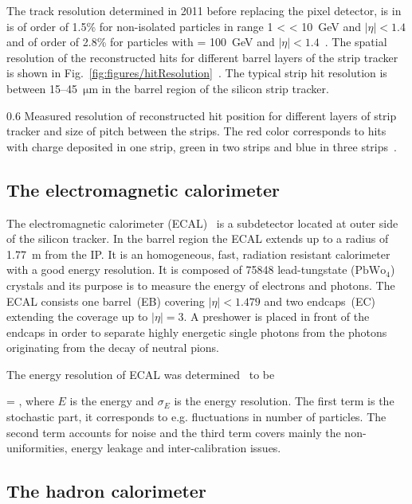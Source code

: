 The track resolution determined in 2011 before replacing the pixel detector, is in \pt is of order of 1.5\% for non-isolated particles in range 1 < \pt < 10~GeV and $|\eta| < 1.4$ and of order of 2.8\% for particles with \pt = 100~GeV and $|\eta| < 1.4$~\cite{TRK-11-001}. The spatial resolution of the reconstructed hits for different barrel layers of the strip tracker is shown in Fig.~\ref{fig:figures/hitResolution}~\cite{website:hitEff}. The typical strip hit resolution is between 15--45~$\mathrm{\mu m}$ in the barrel region of the silicon strip tracker.


                 {0.6}       
                 {Measured resolution of reconstructed hit position for different layers of strip tracker and size of pitch between the strips. The red color corresponds to hits with charge deposited in one strip, green in two strips and blue in three strips~\cite{website:hitEff}. }

\subsection{The electromagnetic calorimeter}

The electromagnetic calorimeter (ECAL)~\cite{tdrECAL} is a subdetector located at outer side of the silicon tracker. In the barrel region the ECAL extends up to a radius of 1.77~m from the IP. It is an homogeneous, fast, radiation resistant calorimeter with a good energy resolution. It is composed of 75848 lead-tungstate ($\mathrm{PbWo_{4}}$) crystals and its purpose is to measure the energy of electrons and photons. The ECAL consists one barrel~(EB) covering $|\eta|<1.479$ and two endcaps~(EC) extending the coverage up to $|\eta| =3$. A preshower is placed in front of the endcaps in order to separate highly energetic single photons from the photons originating from the decay of neutral pions.

The energy resolution of ECAL was determined~\cite{Chatrchyan:2008aa} to be

{
  =  \bigoplus {}  ,
}
where $E$ is the energy and $\sigma_{E}$ is the energy resolution. The first term is the stochastic part, it corresponds to e.g. fluctuations in number of particles. The second term accounts for noise and the third term covers mainly the non-uniformities, energy leakage and inter-calibration issues.


\subsection{The hadron calorimeter}

